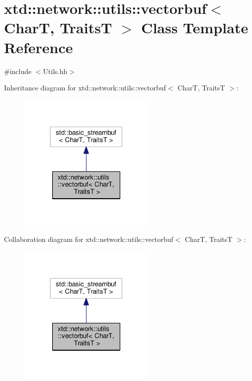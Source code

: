 \hypertarget{classxtd_1_1network_1_1utils_1_1vectorbuf}{\section{xtd\-:\-:network\-:\-:utils\-:\-:vectorbuf$<$ Char\-T, Traits\-T $>$ Class Template Reference}
\label{classxtd_1_1network_1_1utils_1_1vectorbuf}
}


{\ttfamily \#include $<$Utils.\-hh$>$}



Inheritance diagram for xtd\-:\-:network\-:\-:utils\-:\-:vectorbuf$<$ Char\-T, Traits\-T $>$\-:
\nopagebreak
\begin{figure}[H]
\begin{center}
\leavevmode
\includegraphics[width=188pt]{classxtd_1_1network_1_1utils_1_1vectorbuf__inherit__graph}
\end{center}
\end{figure}


Collaboration diagram for xtd\-:\-:network\-:\-:utils\-:\-:vectorbuf$<$ Char\-T, Traits\-T $>$\-:
\nopagebreak
\begin{figure}[H]
\begin{center}
\leavevmode
\includegraphics[width=188pt]{classxtd_1_1network_1_1utils_1_1vectorbuf__coll__graph}
\end{center}
\end{figure}
